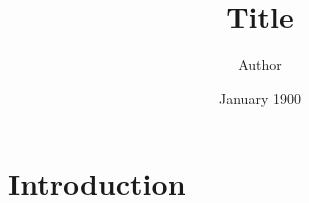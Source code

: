 \documentclass{article}
\title{Title}
\author{Author}
\date{January 1900}
\begin{document}
\maketitle

\section{Introduction}
\end{document}
